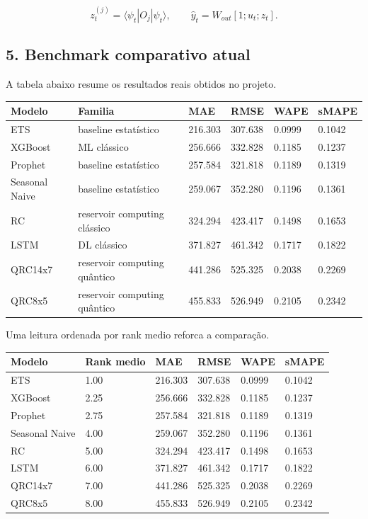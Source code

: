 \documentclass[12pt]{article}
\begin{document}
\[
z_t^{(j)} = \langle \psi_t | O_j | \psi_t \rangle,
\qquad
\hat{y}_t = W_{out} [1; u_t; z_t].
\]

\subsection{5. Benchmark comparativo atual}\label{5-benchmark-comparativo-atual}

A tabela abaixo resume os resultados reais obtidos no projeto.

\begin{longtable}[]{@{}llllll@{}}
\toprule\noalign{}
Modelo & Familia & MAE & RMSE & WAPE & sMAPE \\
\midrule\noalign{}
\endhead
\bottomrule\noalign{}
\endlastfoot
ETS & baseline estatístico & 216.303 & 307.638 & 0.0999 & 0.1042 \\
XGBoost & ML clássico & 256.666 & 332.828 & 0.1185 & 0.1237 \\
Prophet & baseline estatístico & 257.584 & 321.818 & 0.1189 & 0.1319 \\
Seasonal Naive & baseline estatístico & 259.067 & 352.280 & 0.1196 & 0.1361 \\
RC & reservoir computing clássico & 324.294 & 423.417 & 0.1498 & 0.1653 \\
LSTM & DL clássico & 371.827 & 461.342 & 0.1717 & 0.1822 \\
QRC14x7 & reservoir computing quântico & 441.286 & 525.325 & 0.2038 & 0.2269 \\
QRC8x5 & reservoir computing quântico & 455.833 & 526.949 & 0.2105 & 0.2342 \\
\end{longtable}

Uma leitura ordenada por rank medio reforca a comparação.

\begin{longtable}[]{@{}llllll@{}}
\toprule\noalign{}
Modelo & Rank medio & MAE & RMSE & WAPE & sMAPE \\
\midrule\noalign{}
\endhead
\bottomrule\noalign{}
\endlastfoot
ETS & 1.00 & 216.303 & 307.638 & 0.0999 & 0.1042 \\
XGBoost & 2.25 & 256.666 & 332.828 & 0.1185 & 0.1237 \\
Prophet & 2.75 & 257.584 & 321.818 & 0.1189 & 0.1319 \\
Seasonal Naive & 4.00 & 259.067 & 352.280 & 0.1196 & 0.1361 \\
RC & 5.00 & 324.294 & 423.417 & 0.1498 & 0.1653 \\
LSTM & 6.00 & 371.827 & 461.342 & 0.1717 & 0.1822 \\
QRC14x7 & 7.00 & 441.286 & 525.325 & 0.2038 & 0.2269 \\
QRC8x5 & 8.00 & 455.833 & 526.949 & 0.2105 & 0.2342 \\
\end{longtable}
\end{document}
